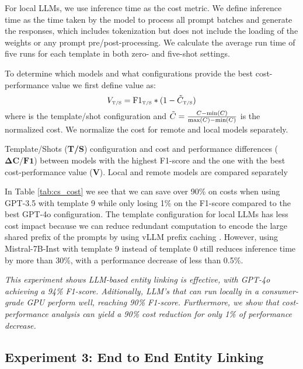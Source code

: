 For local LLMs, we use inference time as the cost metric. We define inference time as the time taken by the model to process all prompt batches and generate the responses, which includes tokenization but does not include the loading of the weights or any prompt pre/post-processing. We calculate the average run time of five runs for each template in both zero- and five-shot settings. 

To determine which models and what configurations provide the best cost-performance value we first define value as:
\begin{equation}
    V_{\text{\tiny T/S}} = \text{F1}_{\text{\tiny T/S}} * (1 - \Tilde{C}_{\text{\tiny T/S}})
\end{equation}
where {} is the template/shot configuration and $\Tilde{C} = \frac{C - \min(C)}{\max(C) - \min(C)}$ is the normalized cost. We normalize the cost for remote and local models separately. 

\begin{table}
    \centering
    \caption{Template/Shots (\textbf{T/S}) configuration and cost and performance differences ($\mathbf{\Delta C/F1}$) between models with the highest F1-score and the one with the best cost-performance value ($\mathbf{V}$). Local and remote models are compared separately}
    
    \label{tab:cs_cost}
\end{table}

In Table \ref{tab:cs_cost} we see that we can save over 90\% on costs when using GPT-3.5 with template 9 while only losing 1\% on the F1-score compared to the best GPT-4o configuration. The template configuration for local LLMs has less cost impact because we can reduce redundant computation to encode the large shared prefix of the prompts by using vLLM prefix caching \cite{Kwon2023}. However, using Mistral-7B-Inst with template 9 instead of template 0 still reduces inference time by more than 30\%, with a performance decrease of less than 0.5\%.

\emph{This experiment shows LLM-based entity linking is effective, with GPT-4o achieving a 94\% F1-score. Aditionally, LLM's that can run locally in a consumer-grade GPU perform well, reaching 90\% F1-score. Furthermore, we show that cost-performance analysis can yield a 90\% cost reduction for only 1\% of performance decrease.}

\subsection{Experiment 3: End to End Entity Linking}

